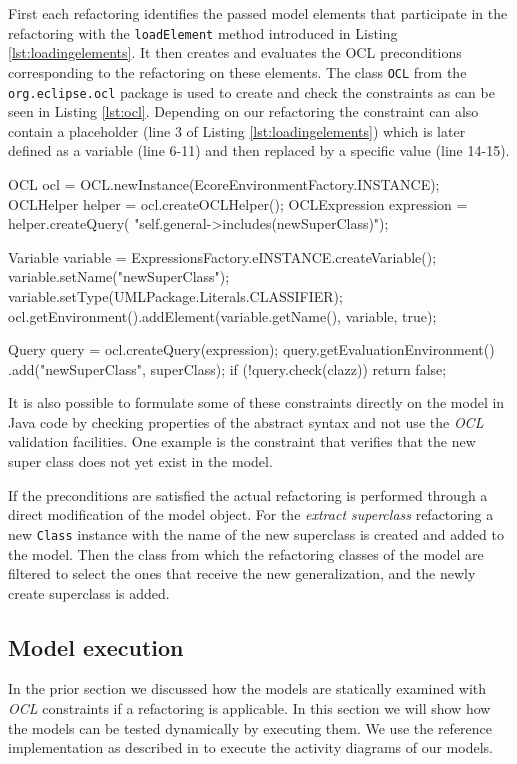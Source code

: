 \documentclass{llncs}
\begin{document}
First each refactoring identifies the passed model elements that participate in the refactoring with the \texttt{loadElement} method introduced 
in Listing \ref{lst:loadingelements}. It then creates and evaluates the OCL 
preconditions corresponding to the refactoring on these elements. The class \texttt{OCL} from the \texttt{org.\-eclipse\-.ocl} package is 
used to create and check the constraints as can be seen in Listing \ref{lst:ocl}. Depending on our refactoring the constraint 
can also contain a placeholder (line 3 of Listing \ref{lst:loadingelements}) which is later defined as a variable (line 6-11) and 
then replaced by a specific value (line 14-15).

\begin{lstsingle}[language=Java,caption=OCL validation in Java,label=lst:ocl]
OCL ocl = OCL.newInstance(EcoreEnvironmentFactory.INSTANCE);
OCLHelper helper = ocl.createOCLHelper();
OCLExpression expression = helper.createQuery(
    "self.general->includes(newSuperClass)");

Variable variable = 
  ExpressionsFactory.eINSTANCE.createVariable();
variable.setName("newSuperClass");
variable.setType(UMLPackage.Literals.CLASSIFIER);
ocl.getEnvironment().addElement(variable.getName(),
                                variable, true);

Query query = ocl.createQuery(expression);
query.getEvaluationEnvironment()
    .add("newSuperClass", superClass);
if (!query.check(clazz))
    return false;
\end{lstsingle}

It is also possible to formulate some of these constraints directly on the model in Java code by checking properties of the abstract syntax
and not use the \textit{OCL} validation facilities. One example is the constraint that verifies that the new super class does not
yet exist in the model.

If the preconditions are satisfied the actual refactoring is performed through a direct modification of the model object.
For the \textit{extract superclass} refactoring a new \texttt{Class} instance with the name of the new superclass is created 
and added to the model. Then the class from which the refactoring 
classes of the model are filtered to select the ones that receive the new generalization, and the newly create superclass
is added.

\subsection{Model execution}
\label{sec:execution}
In the prior section we discussed how the models are statically examined with \textit{OCL} constraints if a refactoring 
is applicable. In this section we will show how the models can be tested dynamically by executing them. We use the 
reference implementation as described in \cite{DBLP:conf/models/MayerhoferLK12} to execute the activity diagrams of 
our models.
\end{document}
